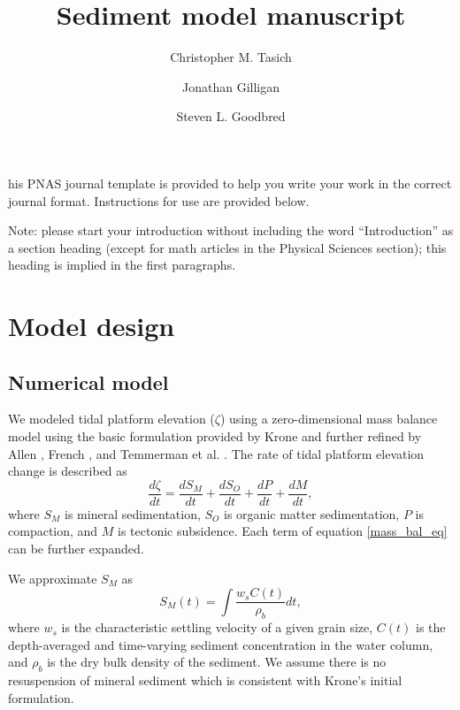 \documentclass[9pt,twocolumn,twoside,lineno]{pnas-new}
\title{Sediment model manuscript}
\author[a,1]{Christopher M. Tasich}
\author[a,2]{Jonathan Gilligan}
\author[a,3]{Steven L. Goodbred}
\affil[a]{Vanderbilt University}
\begin{document}
\maketitle
\thispagestyle{firststyle}

his PNAS journal template is provided to help you write your work in the correct journal format. Instructions for use are provided below. 

Note: please start your introduction without including the word ``Introduction'' as a section heading (except for math articles in the Physical Sciences section); this heading is implied in the first paragraphs. 
\section*{Model design}

\subsection*{Numerical model}

We modeled tidal platform elevation ($\zeta$) using a zero-dimensional mass balance model using the basic formulation provided by Krone \cite{kroneMethodSimulatingMarsh1987} and further refined by Allen \cite{allenSaltmarshGrowthStratification1990}, French \cite{frenchNumericalSimulationVertical1993}, and Temmerman et al. \cite{temmermanModellingLongtermTidal2003,temmermanModellingEstuarineVariations2004}. The rate of tidal platform elevation change is described as
\begin{equation}\label{mass_bal_eq}
	\frac{d \zeta}{d t} = \frac{d S_M}{d t} + \frac{d S_O}{d t} + \frac{d P}{d t} + \frac{d M}{d t},
\end{equation}
where $S_M$ is mineral sedimentation, $S_O$ is organic matter sedimentation, $P$ is compaction, and $M$ is tectonic subsidence. Each term of equation \ref{mass_bal_eq} can be further expanded.

We approximate $S_M$ as
\begin{equation}\label{min_sed_eq}
	S_M(t) = \int{\frac{w_{s}C(t)}{\rho_b}dt},
\end{equation}
where $w_s$ is the characteristic settling velocity of a given grain size, $C(t)$ is the depth-averaged and time-varying sediment concentration in the water column, and $\rho_b$ is the dry bulk density of the sediment. We assume there is no resuspension of mineral sediment which is consistent with Krone's \cite{kroneMethodSimulatingMarsh1987} initial formulation.
\end{document}
